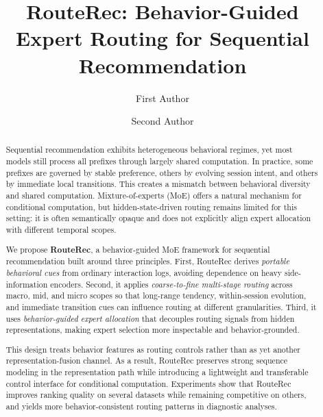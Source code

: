 \documentclass[sigconf,review,anonymous]{acmart}
\begin{document}
\title[RouteRec for Sequential Recommendation]{RouteRec: Behavior-Guided Expert Routing for Sequential Recommendation}

\author{First Author}

\author{Second Author}

\renewcommand{\shortauthors}{Author et al.}

\begin{abstract}
Sequential recommendation exhibits heterogeneous behavioral regimes, yet most models still process all prefixes through largely shared computation. In practice, some prefixes are governed by stable preference, others by evolving session intent, and others by immediate local transitions. This creates a mismatch between behavioral diversity and shared computation. Mixture-of-experts (MoE) offers a natural mechanism for conditional computation, but hidden-state-driven routing remains limited for this setting: it is often semantically opaque and does not explicitly align expert allocation with different temporal scopes.

We propose \textbf{RouteRec}, a behavior-guided MoE framework for sequential recommendation built around three principles. First, RouteRec derives \emph{portable behavioral cues} from ordinary interaction logs, avoiding dependence on heavy side-information encoders. Second, it applies \emph{coarse-to-fine multi-stage routing} across macro, mid, and micro scopes so that long-range tendency, within-session evolution, and immediate transition cues can influence routing at different granularities. Third, it uses \emph{behavior-guided expert allocation} that decouples routing signals from hidden representations, making expert selection more inspectable and behavior-grounded.

This design treats behavior features as routing controls rather than as yet another representation-fusion channel. As a result, RouteRec preserves strong sequence modeling in the representation path while introducing a lightweight and transferable control interface for conditional computation. Experiments show that RouteRec improves ranking quality on several datasets while remaining competitive on others, and yields more behavior-consistent routing patterns in diagnostic analyses.
\end{abstract}
\end{document}

